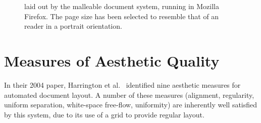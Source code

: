 \begin{figure}
\begin{center}
\end{center}
\caption[A sample of document layout]{\cite{Pinkney2011} laid out by the malleable document system, running in Mozilla Firefox. The page size has been selected to resemble that of an \ebook{} reader in a portrait orientation.}
\label{fig:example-ereader}
\end{figure}

\section{Measures of Aesthetic Quality}
In their 2004 paper, Harrington et al.~\cite{Harrington2004} identified nine aesthetic measures for automated document layout. A number of these measures (alignment, regularity, uniform separation, white-space free-flow, uniformity) are inherently well satisfied by this system, due to its use of a grid to provide regular layout. 


